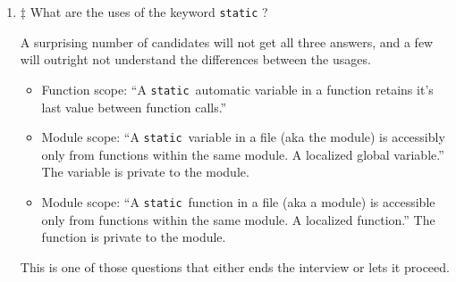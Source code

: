 \documentclass[12pt]{article}
\newcommand{\cstatic}{{\texttt{static}}}%
\begin{document}
\begin{enumerate}
Here's what we want to see:
\begin{itemize}
\item An integer. {\texttt{int x;}}
\item A pointer to an integer. {\texttt{int* x;}}
\item A pointer to a pointer to an integer. {\texttt{int** x;}}
\item An array of ten integers. {\texttt{int x[10];}}
\item An array of ten pointers to integers. {\texttt{int* x[10];}}
\item A pointer to an array of ten integers  {\texttt{int (*x)[10];}}  (this one may catch your candidate.)
\item A pointer to a function that takes an integer argument  and returns an integer.
  {\texttt{ int (*x)(int); }}
\item An array of ten pointers to functions that each take an integer argument and each
return an integer.  {\texttt{ int (*x[10])(int); }}
\end{itemize}

These are the kinds of questions that may seem nit-picky.  They are.  And some may argue that
it would require the candidate to a bit of preparation ahead of time to be sure they
grok all the ways to declare things.  If they weren't prepared for the interview to know this,
then what are they prepared for?

\item $\ddagger$ What are the uses of the keyword {\texttt{static}} ?

A surprising number of candidates will not get all three answers, and a few will
outright not understand the differences between the usages.

\begin{itemize}
\item Function scope:  ``A \cstatic\ automatic variable in a function
retains it's last value between function calls.''
\item Module scope:  ``A \cstatic\ variable in a file (aka the module)
is accessibly only from functions within the same module.  A localized global variable.''  The 
variable is private to the module.
\item Module scope:  ``A \cstatic\ function in a file (aka a module)
is accessible only from functions within the same module. A localized function.''  The function
is private to the module.
\end{itemize}

This is one of those questions that either ends the interview or lets it proceed.


\end{enumerate}
\end{document}
